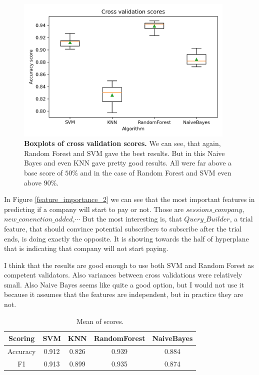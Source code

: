 \documentclass[fleqn,moreauthors,10pt]{ds_report}
\begin{document}
\begin{figure}[h]\centering
	\includegraphics[width=\linewidth, height=7cm]{problem_2_boxplot_all_data.png}
	
	\caption{\textbf{Boxplots of cross validation scores.} We can see, that again, Random Forest and SVM gave the best results. But in this Naive Bayes and even KNN gave pretty good results. All were far above a base score of $50\%$ and in the case of Random Forest and SVM even above $90\%$. }
	\label{boxplot2}
\end{figure}

In Figure \ref{feature_importance_2} we can see that the most important features in predicting if a company will start to pay or not. Those are $sessions\_company$, $new\_conenction\_added$,$\cdots$  But the most interesting is, that $Query\_Builder$, a trial feature, that should convince potential subscribers to subscribe after the trial ends, is doing exactly the opposite.  It is showing towards the half of hyperplane that is indicating that company will not start paying.

I think that the results are good enough to use both SVM and Random Forest as competent validators. Also variances between cross validations were relatively small. Also Naive Bayes seems like quite a good option, but I would not use it because it assumes that the features are independent, but in practice they are not. 


\begin{center}
\begin{table}
\caption{\label{table_2} Mean of scores.}

\begin{tabular}{|c|| c| c| c| c|} 
 \hline
 Scoring  & SVM & KNN & RandomForest  & NaiveBayes\\ 
 \hline\hline
 Accuracy & 0.912 & 0.826 &  0.939 & 0.884\\ 
 \hline
 F1 & 0.913 & 0.899 & 0.935 & 0.874 \\
 \hline
\end{tabular}
\end{table}
\end{center}
\end{document}
